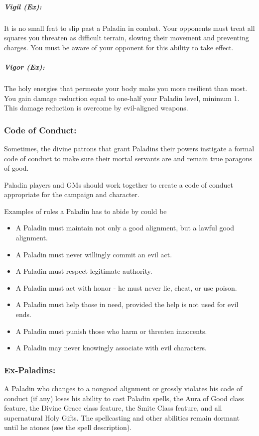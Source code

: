 \subparagraph{Vigil (Ex):}
It is no small feat to slip past a Paladin in combat. Your opponents must treat all squares you threaten as difficult terrain, slowing their movement and preventing charges. You must be aware of your opponent for this ability to take effect.

\subparagraph{Vigor (Ex):}
The holy energies that permeate your body make you more resilient than most. You gain damage reduction equal to one-half your Paladin level, minimum 1. This damage reduction is overcome by evil-aligned weapons.

\subsubsection{Code of Conduct:}
Sometimes, the divine patrons that grant Paladins their powers instigate a formal code of conduct to make sure their mortal servants are and remain true paragons of good.

Paladin players and GMs should work together to create a code of conduct appropriate for the campaign and character.

Examples of rules a Paladin has to abide by could be
\begin{itemize}
 \item A Paladin must maintain not only a good alignment, but a lawful good alignment.
 \item A Paladin must never willingly commit an evil act.
 \item A Paladin must respect legitimate authority.
 \item A Paladin must act with honor - he must never lie, cheat, or use poison.
 \item A Paladin must help those in need, provided the help is not used for evil ends.
 \item A Paladin must punish those who harm or threaten innocents.
 \item A Paladin may never knowingly associate with evil characters.
\end{itemize}
\subsubsection{Ex-Paladins:}
A Paladin who changes to a nongood alignment or grossly violates his code of conduct (if any) loses his ability to cast Paladin spells, the Aura of Good class feature, the Divine Grace class feature, the Smite Class feature, and all supernatural Holy Gifts.
The spellcasting and other abilities remain dormant until he atones (see the  spell description).


